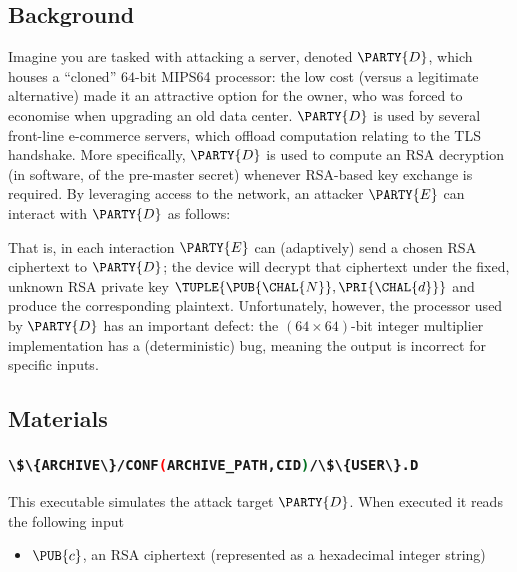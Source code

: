\documentclass[crop={false},multi={true},tikz={true}]{standalone}
\begin{document}

\subsection{Background}

Imagine you are tasked with attacking a server, denoted $\PARTY{D}$, 
which houses a ``cloned'' $64$-bit MIPS64 processor: the low cost (versus a 
legitimate alternative) made it an attractive option for the owner, who was
forced to economise when upgrading an old data center.
$\PARTY{D}$ is used by several front-line e-commerce servers, which offload
computation relating to the TLS handshake.  More specifically, $\PARTY{D}$ 
is used to compute an RSA decryption (in software, of the pre-master secret)
whenever RSA-based key exchange is required.
By leveraging access to the network, 
an attacker $\PARTY{E}$ can interact with $\PARTY{D}$ as follows:

\begin{center}

\end{center}

\noindent
That is, in each interaction $\PARTY{E}$ can (adaptively) send 
a chosen RSA ciphertext
to $\PARTY{D}$; the device will
decrypt that ciphertext under the fixed, unknown RSA private key $\TUPLE{ \PUB{\CHAL{N}}, \PRI{\CHAL{d}} }$ 
and produce 
the corresponding  plaintext.
Unfortunately, however, the processor used by $\PARTY{D}$ has an important
defect: the $( 64 \times 64 )$-bit integer multiplier implementation has a
(deterministic) bug, meaning the output is incorrect for specific inputs.

\subsection{Materials}

\subsubsection{\lstinline[language={bash}]|\$\{ARCHIVE\}/CONF(ARCHIVE_PATH,CID)/\$\{USER\}.D|}

This executable simulates the attack target $\PARTY{D}$.  When executed it 
reads the following input

\begin{itemize}
\item $\PUB{c}$,
      an RSA ciphertext
      (represented as a  hexadecimal integer string)
\end{itemize}
\end{document}
